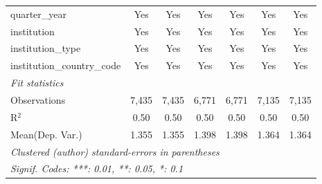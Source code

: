 \begin{tabular}{lcccccc}
   quarter\_year                      & Yes     & Yes     & Yes     & Yes     & Yes     & Yes\\  
   institution                        & Yes     & Yes     & Yes     & Yes     & Yes     & Yes\\  
   institution\_type                  & Yes     & Yes     & Yes     & Yes     & Yes     & Yes\\  
   institution\_country\_code         & Yes     & Yes     & Yes     & Yes     & Yes     & Yes\\  
   \midrule
   \emph{Fit statistics}\\
   Observations                       & 7,435   & 7,435   & 6,771   & 6,771   & 7,135   & 7,135\\  
   R$^2$                              & 0.50    & 0.50    & 0.50    & 0.50    & 0.50    & 0.50\\  
Mean(Dep. Var.) & 1.355 & 1.355 & 1.398 & 1.398 & 1.364 & 1.364 \\
   \midrule \midrule
   \multicolumn{7}{l}{\emph{Clustered (author) standard-errors in parentheses}}\\
   \multicolumn{7}{l}{\emph{Signif. Codes: ***: 0.01, **: 0.05, *: 0.1}}\\
\end{tabular}
\par\endgroup
